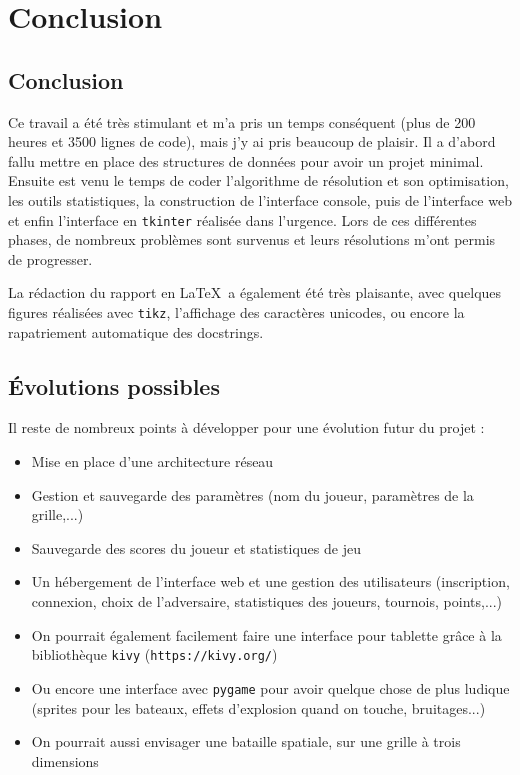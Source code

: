 \chapter{Conclusion}
\section{Conclusion}
Ce travail a été très stimulant et m'a pris un temps conséquent (plus de 200 heures et 3500 lignes de code), mais j'y ai pris beaucoup de plaisir. Il a d'abord fallu mettre en place des structures de données pour avoir un projet minimal. Ensuite est venu le temps de coder l'algorithme de résolution et son optimisation, les outils statistiques, la construction de l'interface console, puis de l'interface web et enfin l'interface en \texttt{tkinter} réalisée dans l'urgence. Lors de ces différentes phases, de nombreux problèmes sont survenus et leurs résolutions m'ont permis de progresser.

\medskip

La rédaction du rapport en \LaTeX\ a également été très plaisante, avec quelques figures réalisées avec \texttt{tikz}, l'affichage des caractères unicodes, ou encore la rapatriement automatique des docstrings. 

\section{Évolutions possibles}
Il reste de nombreux points à développer pour une évolution futur du projet :
\begin{itemize}
\item Mise en place d'une architecture réseau
\item Gestion et sauvegarde des paramètres (nom du joueur, paramètres de la grille,...)
\item Sauvegarde des scores du joueur et statistiques de jeu
\item Un hébergement de l'interface web et une gestion des utilisateurs (inscription, connexion, choix de l'adversaire, statistiques des joueurs, tournois, points,...)
\item On pourrait également facilement faire une interface pour tablette grâce à la bibliothèque \texttt{kivy} (\texttt{https://kivy.org/})
\item Ou encore une interface avec \texttt{pygame} pour avoir quelque chose de plus ludique (sprites pour les bateaux, effets d'explosion quand on touche, bruitages...)
\item On pourrait aussi envisager une bataille spatiale, sur une grille à trois dimensions  
\end{itemize}


